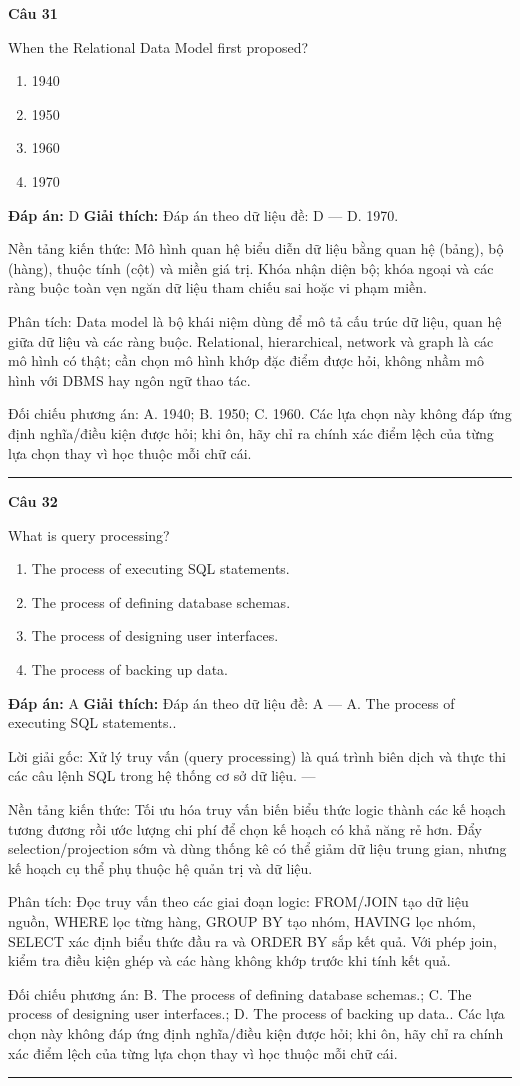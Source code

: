 \documentclass[11pt,a4paper]{article}
\newenvironment{question}[1]{%
  \par\vspace{1em}\noindent\textbf{\large Câu #1}\par\vspace{0.4em}
}{%
  \par\vspace{1em}\hrule\vspace{0.6em}
}
\newenvironment{choices}{%
  \begin{enumerate}[label=\textbf{\Alph*.},leftmargin=2.2em,itemsep=2pt,topsep=3pt]
}{%
  \end{enumerate}
}
\newcommand{\choice}{\item}
\begin{document}
\begin{question}{31}
When the Relational Data Model first proposed?
\begin{choices}
\choice 1940
\choice 1950
\choice 1960
\choice 1970
\end{choices}
\textbf{Đáp án:} D
\textbf{Giải thích:} Đáp án theo dữ liệu đề: D — D. 1970.

Nền tảng kiến thức: Mô hình quan hệ biểu diễn dữ liệu bằng quan hệ (bảng), bộ (hàng), thuộc tính (cột) và miền giá trị. Khóa nhận diện bộ; khóa ngoại và các ràng buộc toàn vẹn ngăn dữ liệu tham chiếu sai hoặc vi phạm miền.

Phân tích: Data model là bộ khái niệm dùng để mô tả cấu trúc dữ liệu, quan hệ giữa dữ liệu và các ràng buộc. Relational, hierarchical, network và graph là các mô hình có thật; cần chọn mô hình khớp đặc điểm được hỏi, không nhầm mô hình với DBMS hay ngôn ngữ thao tác.

Đối chiếu phương án: A. 1940; B. 1950; C. 1960. Các lựa chọn này không đáp ứng định nghĩa/điều kiện được hỏi; khi ôn, hãy chỉ ra chính xác điểm lệch của từng lựa chọn thay vì học thuộc mỗi chữ cái.
\end{question}


\begin{question}{32}
What is query processing?
\begin{choices}
\choice The process of executing SQL statements.
\choice The process of defining database schemas.
\choice The process of designing user interfaces.
\choice The process of backing up data.
\end{choices}
\textbf{Đáp án:} A
\textbf{Giải thích:} Đáp án theo dữ liệu đề: A — A. The process of executing SQL statements..

Lời giải gốc: Xử lý truy vấn (query processing) là quá trình biên dịch và thực thi các câu lệnh SQL trong hệ thống cơ sở dữ liệu. ---

Nền tảng kiến thức: Tối ưu hóa truy vấn biến biểu thức logic thành các kế hoạch tương đương rồi ước lượng chi phí để chọn kế hoạch có khả năng rẻ hơn. Đẩy selection/projection sớm và dùng thống kê có thể giảm dữ liệu trung gian, nhưng kế hoạch cụ thể phụ thuộc hệ quản trị và dữ liệu.

Phân tích: Đọc truy vấn theo các giai đoạn logic: FROM/JOIN tạo dữ liệu nguồn, WHERE lọc từng hàng, GROUP BY tạo nhóm, HAVING lọc nhóm, SELECT xác định biểu thức đầu ra và ORDER BY sắp kết quả. Với phép join, kiểm tra điều kiện ghép và các hàng không khớp trước khi tính kết quả.

Đối chiếu phương án: B. The process of defining database schemas.; C. The process of designing user interfaces.; D. The process of backing up data.. Các lựa chọn này không đáp ứng định nghĩa/điều kiện được hỏi; khi ôn, hãy chỉ ra chính xác điểm lệch của từng lựa chọn thay vì học thuộc mỗi chữ cái.
\end{question}
\end{document}
